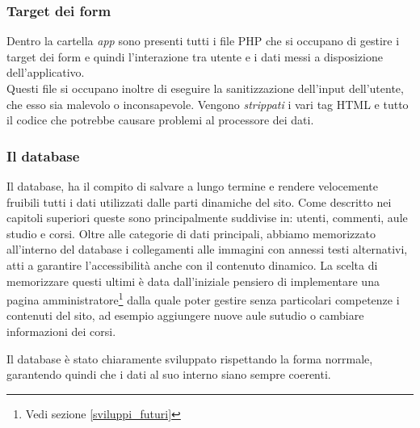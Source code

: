 \subsubsection{Target dei form}
Dentro la cartella \textit{app} sono presenti tutti i file PHP che si occupano di gestire i target dei form e quindi l'interazione tra utente e i dati messi a disposizione dell'applicativo.\\
Questi file si occupano inoltre di eseguire la sanitizzazione dell'input dell'utente, che esso sia malevolo o inconsapevole. Vengono \textit{strippati} i vari tag HTML e tutto il codice che potrebbe causare problemi al processore dei dati.

\subsubsection{Il database}
Il database, ha il compito di salvare a lungo termine e rendere velocemente fruibili tutti i dati utilizzati  dalle parti dinamiche del sito. Come descritto nei capitoli superiori queste sono principalmente suddivise in: utenti, commenti, aule studio e corsi.
Oltre alle categorie di dati principali, abbiamo memorizzato all'interno del database i collegamenti alle immagini con annessi testi alternativi, atti a garantire l'accessibilità anche con il contenuto dinamico.
La scelta di memorizzare questi ultimi è data dall'iniziale pensiero di implementare una pagina amministratore\footnote{Vedi sezione \ref{sviluppi_futuri}} dalla quale poter gestire senza particolari competenze i contenuti del sito, ad esempio aggiungere nuove aule sutudio o cambiare informazioni dei corsi.

Il database è stato chiaramente sviluppato rispettando la forma norrmale, garantendo quindi che i dati al suo interno siano sempre coerenti.